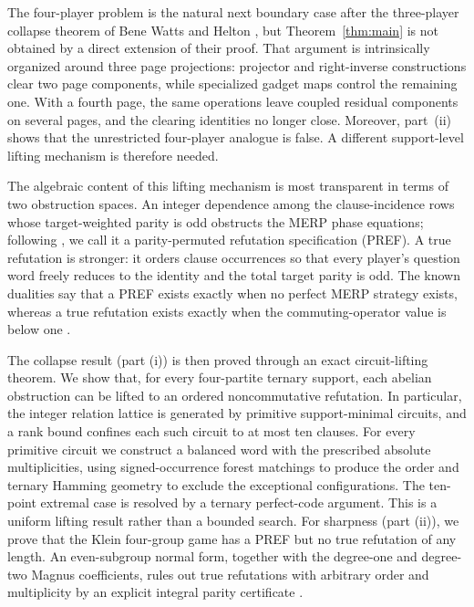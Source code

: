 \documentclass[11pt]{article}
\theoremstyle{definition}
\theoremstyle{remark}
\numberwithin{equation}{section}
\begin{document}
The four-player problem is the natural next boundary case after the
three-player collapse theorem of Bene Watts and Helton
\cite{WattsHelton2023}, but Theorem~\ref{thm:main} is not obtained by a
direct extension of their proof.  That argument is intrinsically organized
around three page projections: projector and right-inverse constructions
clear two page components, while specialized gadget maps control the
remaining one.  With a fourth page, the same operations leave coupled
residual components on several pages, and the clearing identities no longer
close.  Moreover, part~(ii) shows that the unrestricted four-player analogue
is false. A different support-level lifting mechanism is therefore needed.

The algebraic content of this lifting mechanism is most transparent in terms
of two obstruction spaces.  An integer dependence
among the clause-incidence rows whose target-weighted parity is odd obstructs
the MERP phase equations; following
\cite{WattsHarrowKanwarNatarajan2019}, we call it a parity-permuted refutation
specification (PREF).  A true refutation is stronger: it orders clause
occurrences so that every player's question word freely reduces to the
identity and the total target parity is odd.  The known dualities say that a
PREF exists exactly when no perfect MERP strategy exists, whereas a true
refutation exists exactly when the commuting-operator value is below one
\cite{WattsHarrowKanwarNatarajan2019,WattsHelton2023,WattsHeltonKlep2023}.

The collapse result (part (i)) is then proved through an exact circuit-lifting theorem. We show that, for every four-partite ternary
support, each abelian obstruction can be lifted to an ordered
noncommutative refutation. In particular, the
integer relation lattice is generated by primitive support-minimal circuits,
and a rank bound confines each such circuit to at most ten clauses.  For every
primitive circuit we construct a balanced word with the prescribed absolute
multiplicities, using signed-occurrence forest matchings to produce the order
and ternary Hamming geometry to exclude the exceptional configurations.  The
ten-point extremal case is resolved by a ternary perfect-code argument. This
is a uniform lifting result rather than a bounded search. For sharpness (part (ii)), we prove that the Klein four-group game has a PREF but no true refutation of any length. An even-subgroup normal
form, together with the degree-one and degree-two Magnus coefficients, rules
out true refutations with arbitrary order and multiplicity by an explicit
integral parity certificate \cite{Magnus1937,MagnusKarrassSolitar1976}.
\end{document}
